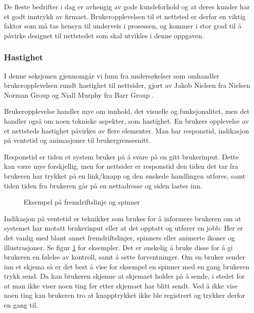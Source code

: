 De fleste bedrifter i dag er avhengig av gode kundeforhold og at deres kunder har et godt inntrykk av firmaet. Brukeropplevelsen til et nettsted er derfor en viktig faktor som må tas hensyn til underveis i prosessen, og kommer i stor grad til å påvirke designet til nettstedet som skal utvikles i denne oppgaven.

\subsubsection{Hastighet}
I denne seksjonen gjennomgår vi funn fra undersøkelser som omhandler brukeropplevelsen rundt hastighet til nettsider, gjort av Jakob Nielsen fra Nielsen Norman Group \cite{nngroupWebsiteResponseTimes} og Niall Murphy fra Barr Group \cite{barrgroupReponseTimingUI}. 

Brukeropplevelse handler mye om innhold, det visuelle og funksjonalitet, men det handler også om noen tekniske aspekter, som hastighet. En brukers opplevelse av et nettsteds hastighet påvirkes av flere elementer. Man har responstid, indikasjon på ventetid og animasjoner til brukergrensesnitt.

Responstid er tiden et system bruker på å svare på en gitt brukerinput.
Dette kan være mye forskjellig, men for nettsider er responstid den tiden det tar fra brukeren har trykket på en link/knapp og den ønskede handlingen utføres, samt tiden tiden fra brukeren går på en nettadresse og siden lastes inn.

\begin{figure}[H]
    \centering
    \caption{Eksempel på fremdriftslinje og spinner}
    \label{fig:analysis-loading-indicators}
\end{figure}

Indikasjon på ventetid er teknikker som brukes for å informere brukeren om at systemet har motatt brukerinput eller at det opptatt og utfører en jobb. Her er det vanlig med blant annet fremdriftslinjer, spinners eller animerte ikoner og illustrasjoner. Se figur \ref{fig:analysis-loading-indicators} for eksempler.
Det er ønskelig å bruke disse for å gi brukeren en følelse av kontroll, samt å sette forventninger. Om en bruker sender inn et skjema så er det best å vise for eksempel en spinner med en gang brukeren trykk send. Da kan brukeren skjønne at skjemaet holder på å sende, i stedet for at man ikke viser noen ting før etter skjemaet har blitt sendt. Ved å ikke vise noen ting kan brukeren tro at knapptrykket ikke ble registrert og trykker derfor en gang til. 

